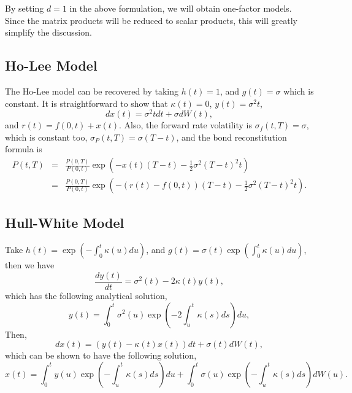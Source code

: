 \documentclass[12pt]{article}
\begin{document}
  By setting $d=1$ in the above formulation, we will obtain one-factor models. Since the matrix products will be reduced to
  scalar products, this will greatly simplify the discussion.
  
  \subsection{Ho-Lee Model}

  The Ho-Lee model can be recovered by taking $h(t)=1$, and $g(t)=\sigma$ which is constant. It is straightforward to show that
  $\kappa(t)=0$, $y(t)=\sigma^2t$,
  \begin{equation}
    dx(t)=\sigma^2tdt+\sigma dW(t),
  \end{equation}
  and $r(t)=f(0,t)+x(t)$. Also, the forward rate volatility is $\sigma_f(t,T)=\sigma$, which is constant too, $\sigma_P(t,T)=\sigma(T-t)$, and the bond
  reconstitution formula is
  \begin{eqnarray}
    P(t,T)&=&\frac{P(0,T)}{P(0,t)}\exp\left(-x(t)(T-t)-\frac{1}{2}\sigma^2(T-t)^2t\right)\nonumber\\
          &=&\frac{P(0,T)}{P(0,t)}\exp\left(-\left(r(t)-f(0,t)\right)(T-t)-\frac{1}{2}\sigma^2(T-t)^2t\right).
  \end{eqnarray}
  
  
  \subsection{Hull-White Model}

  Take $h(t)=\exp\left(-\int_0^t\kappa(u)du\right)$, and $g(t)=\sigma(t)\exp\left(\int_0^t\kappa(u)du\right)$, then we have
  \begin{equation}
    \frac{dy(t)}{dt} = \sigma^2(t) - 2\kappa(t)y(t),
  \end{equation}
  which has the following analytical solution,
  \begin{equation}
    y(t)=\int_0^t\sigma^2(u)\exp\left(-2\int_u^t\kappa(s)ds\right)du,
  \end{equation}
  Then,
  \begin{equation}
    dx(t)=\left(y(t)-\kappa(t)x(t)\right)dt+\sigma(t)dW(t),
  \end{equation}
  which can be shown to have the following solution,
  \begin{equation}
    x(t)=\int_0^ty(u)\exp\left(-\int_u^t\kappa(s)ds\right)du+\int_0^t\sigma(u)\exp\left(-\int_u^t\kappa(s)ds\right)dW(u).
  \end{equation}
  
\end{document}
